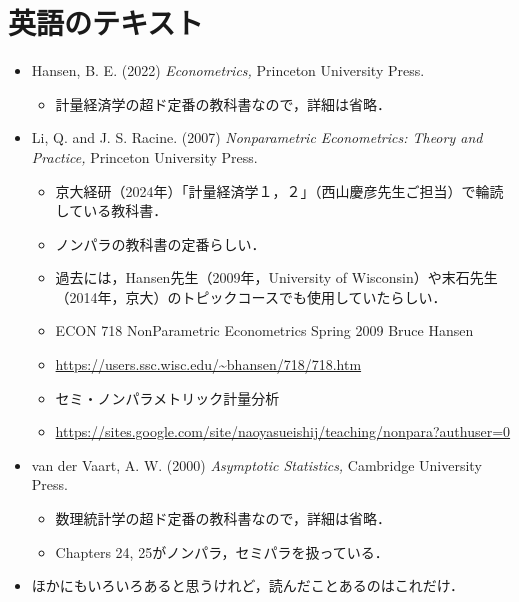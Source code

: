 \documentclass{jsarticle}
\begin{document}
\large

\section{英語のテキスト}

\begin{itemize}
  \item Hansen, B. E. (2022)
        \textit{Econometrics,} Princeton University Press.
        \begin{itemize}
          \item 計量経済学の超ド定番の教科書なので，詳細は省略．
        \end{itemize}
  
  \item Li, Q. and J. S. Racine. (2007)
        \textit{Nonparametric Econometrics: Theory and Practice,} 
        Princeton University Press.

        \begin{itemize}
        \item 京大経研（2024年）「計量経済学１，２」（西山慶彦先生ご担当）で輪読している教科書．
        \item ノンパラの教科書の定番らしい．
        \item 過去には，Hansen先生（2009年，University of Wisconsin）や末石先生（2014年，京大）のトピックコースでも使用していたらしい．
        \item ECON 718 NonParametric Econometrics Spring 2009 Bruce Hansen 
        \item \url{https://users.ssc.wisc.edu/~bhansen/718/718.htm}
        \item セミ・ノンパラメトリック計量分析 
        \item \url{https://sites.google.com/site/naoyasueishij/teaching/nonpara?authuser=0}
        \end{itemize}
  
  \item van der Vaart, A. W. (2000) 
  \textit{Asymptotic Statistics,} Cambridge University Press.
        \begin{itemize}
          \item 数理統計学の超ド定番の教科書なので，詳細は省略．
          \item Chapters 24, 25がノンパラ，セミパラを扱っている．
        \end{itemize}

  \item ほかにもいろいろあると思うけれど，読んだことあるのはこれだけ．
\end{itemize}
\end{document}
